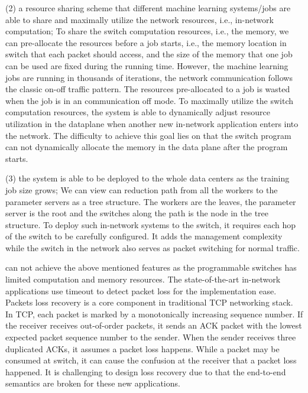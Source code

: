 (2) a resource sharing scheme that different machine learning systems/jobs
are able to share and maximally utilize the network resources, i.e., in-network computation;
To share the switch computation resources, i.e., the memory, we can pre-allocate 
the resources before a job starts, i.e., 
the memory location in switch that each packet should access, and the
size of the memory that one job can be used are fixed during the running time.
However, the machine learning jobs are running in thousands of iterations, 
the network communication
follows the classic on-off traffic pattern. The resources pre-allocated to 
a job is wasted when the job is in an communication off mode.
To maximally utilize the switch computation resources, 
the system is able to dynamically adjust resource utilization in
the dataplane when another new in-network application enters into the network.
The difficulty to achieve this goal lies on that the switch program can not dynamically 
allocate the memory in the data plane after the program starts.

(3) the system is able to be deployed to the whole data centers as
the training job size grows;
We can view can reduction path from all the workers to the parameter servers as a tree structure.
The workers are the leaves, the parameter server is the root and the switches along the path 
is the node in the tree structure.
To deploy such in-network systems to the switch, it requires each hop of the switch 
to be carefully configured.
It adds the management complexity while the switch 
in the network also serves as packet switching for normal traffic.


\switchml can not achieve the above mentioned features as the programmable
switches has limited computation and memory resources.
The state-of-the-art in-network applications use timeout to detect packet loss for the implementation ease. Packets loss recovery is a core component in
traditional TCP networking stack.
In TCP, each packet is marked by a monotonically increasing sequence number. 
If the receiver receives out-of-order packets, it sends an ACK packet with the lowest 
expected packet sequence number to the sender. 
When the sender receives three duplicated ACKs, it assumes a packet loss happens.
While a packet may be consumed at switch, it can cause the confusion at the receiver
that a packet loss happened. It is challenging to design loss recovery due to that the end-to-end semantics are broken 
for these new applications.
 

